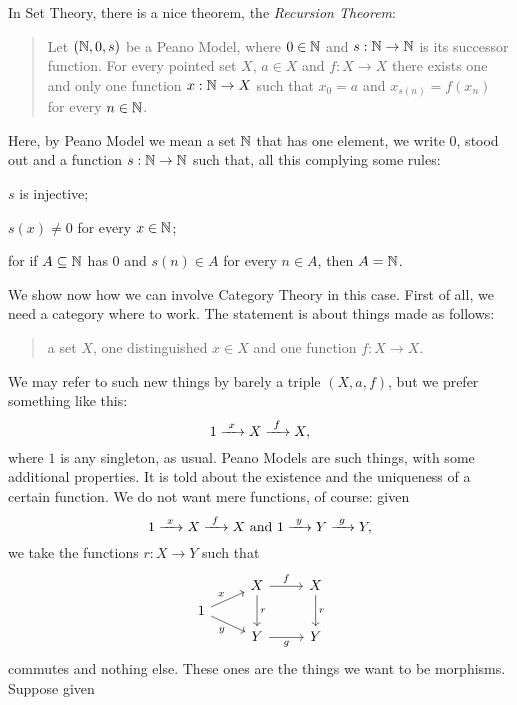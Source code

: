 \begin{example}[Recursion]\label{example:Recursion}
In Set Theory, there is a nice theorem, the {\em Recursion Theorem}:
\begin{quotation}
Let \((\mathbb N, 0, s)\) be a Peano Model, where \(0 \in \mathbb N\) and \(s : \mathbb N \to \mathbb N\) is its successor function. For every pointed set \(X\), \(a \in X\) and \(f : X \to X\) there exists one and only one function \(x : \mathbb N \to X\) such that \(x_0 = a\) and \(x_{s(n)} = f(x_n)\) for every \(n \in \mathbb N\).
\end{quotation}
Here, by Peano Model we mean a set \(\mathbb N\) that has one element, we write \(0\), stood out and a function \(s : \mathbb N \to \mathbb N\) such that, all this complying some rules:
\begin{tcbenum}
\item \(s\) is injective;
\item \(s(x) \ne 0\) for every \(x \in \mathbb N\);
\item for if \(A \subseteq \mathbb N\) has \(0\) and \(s(n) \in A\) for every \(n \in A\), then \(A = \mathbb N\).
\end{tcbenum}
We show now how we can involve Category Theory in this case. First of all, we need a category where to work.\newline
The statement is about things made as follows:
\begin{quotation}
a set \(X\), one distinguished \(x \in X\) and one function \(f : X \to X\).
\end{quotation}
We may refer to such new things by barely a triple \((X, a, f)\), but we prefer something like this:
\[1 \xrightarrow{\ x\ } X \xrightarrow{\ f\ } X ,\]
where \(1\) is any singleton, as usual. Peano Models are such things, with some additional properties. It is told about the existence and the uniqueness of a certain function. We do not want mere functions, of course: given
\[1 \xrightarrow{\ x\ } X \xrightarrow{\ f\ } X \text{ and } 1 \xrightarrow{\ y\ } Y \xrightarrow{\ g\ } Y ,\]
we take the functions \(r : X \to Y\) such that
\[\begin{tikzcd}[row sep=tiny]
& X \ar["f", r] \ar["r", dd] & X \ar["r", dd] \\
1 \ar["x", ur] \ar["y", dr, swap] \\
& Y \ar["g", r, swap] & Y
\end{tikzcd}\]
commutes and nothing else.  These ones are the things we want to be morphisms. Suppose given

\end{example}
